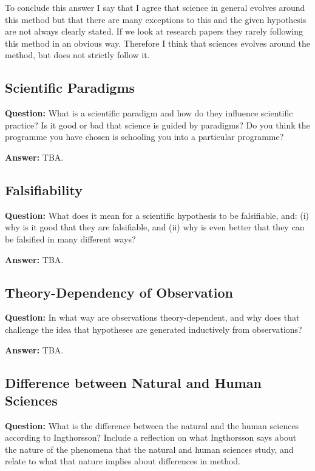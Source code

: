 \documentclass[11pt]{scrartcl}
\begin{document}
To conclude this answer I say that I agree that science in general evolves around this method but that there are many exceptions to this and the given hypothesis are not always clearly stated. If we look at research papers they rarely following this method in an obvious way. Therefore I think that sciences evolves around the method, but does not strictly follow it.

\subsection{Scientific Paradigms}

\textbf{Question:} What is a scientific paradigm and how do they influence scientific practice? Is it good or bad that science is guided by paradigms? Do you think the programme you have chosen is schooling you into a particular programme?

\bigbreak

\textbf{Answer:} TBA.

\subsection{Falsifiability}

\textbf{Question:} What does it mean for a scientific hypothesis to be falsifiable, and: (i) why is it good that they are falsifiable, and (ii) why is even better that they can be falsified in many different ways?

\bigbreak

\textbf{Answer:} TBA.

\subsection{Theory-Dependency of Observation}

\textbf{Question:} In what way are observations theory-dependent, and why does that challenge the idea that hypotheses are generated inductively from observations?

\bigbreak

\textbf{Answer:} TBA.

\subsection{Difference between Natural and Human Sciences}

\textbf{Question:} What is the difference between the natural and the human sciences according to Ingthorsson? Include a reflection on what Ingthorsson says about the nature of the phenomena that the natural and human sciences study, and relate to what that nature implies about differences in method.
\end{document}
